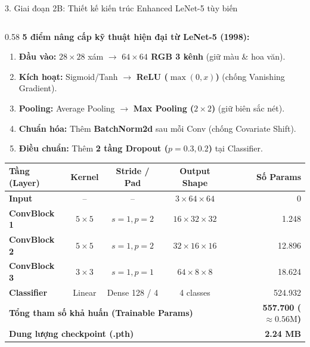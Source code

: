 \documentclass[aspectratio=169, 10pt]{beamer}
\begin{document}
\begin{frame}{3. Giai đoạn 2B: Thiết kế kiến trúc Enhanced LeNet-5 tùy biến}
  \begin{columns}[T]
    \begin{column}{0.58\textwidth}
      \textbf{5 điểm nâng cấp kỹ thuật hiện đại từ LeNet-5 (1998):}
      \begin{enumerate}\setlength{\itemsep}{1pt}\scriptsize
        \item \textbf{Đầu vào:} $28\times 28$ xám $\rightarrow$ \textbf{$64\times 64$ RGB 3 kênh} (giữ màu \& hoa văn).
        \item \textbf{Kích hoạt:} Sigmoid/Tanh $\rightarrow$ \textbf{ReLU ($\max(0, x)$)} (chống Vanishing Gradient).
        \item \textbf{Pooling:} Average Pooling $\rightarrow$ \textbf{Max Pooling ($2\times 2$)} (giữ biên sắc nét).
        \item \textbf{Chuẩn hóa:} Thêm \textbf{BatchNorm2d} sau mỗi Conv (chống Covariate Shift).
        \item \textbf{Điều chuẩn:} Thêm \textbf{2 tầng Dropout ($p=0.3, 0.2$)} tại Classifier.
      \end{enumerate}

      \vspace{0.05cm}
      \tiny
      \begin{tabular}{|l|c|c|c|r|}
        \hline
        \textbf{Tầng (Layer)} & \textbf{Kernel} & \textbf{Stride / Pad} & \textbf{Output Shape} & \textbf{Số Params} \\
        \hline
        \textbf{Input} & -- & -- & $3 \times 64 \times 64$ & 0 \\
        \textbf{ConvBlock 1} & $5 \times 5$ & $s=1, p=2$ & $16 \times 32 \times 32$ & 1.248 \\
        \textbf{ConvBlock 2} & $5 \times 5$ & $s=1, p=2$ & $32 \times 16 \times 16$ & 12.896 \\
        \textbf{ConvBlock 3} & $3 \times 3$ & $s=1, p=1$ & $64 \times 8 \times 8$ & 18.624 \\
        \textbf{Classifier} & Linear & Dense 128 / 4 & 4 classes & 524.932 \\
        \hline
        \multicolumn{4}{|l|}{\textbf{Tổng tham số khả huấn (Trainable Params)}} & \textbf{557.700 ($\approx 0.56\text{M}$)} \\
        \multicolumn{4}{|l|}{\textbf{Dung lượng checkpoint (.pth)}} & \textbf{2.24 MB} \\
        \hline
      \end{tabular}
    \end{column}


\end{columns}
\end{frame}
\end{document}
